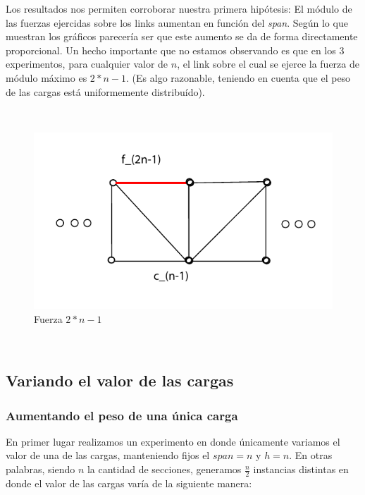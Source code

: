 Los resultados nos permiten corroborar nuestra primera hipótesis: El módulo de las fuerzas ejercidas sobre los links aumentan en función
del \emph{span}. Según lo que muestran los gráficos parecería ser que este aumento se da de forma directamente proporcional. Un hecho
importante que no estamos observando es que en los 3 experimentos, para cualquier valor de $n$, el link sobre el cual se ejerce 
la fuerza de módulo máximo es $2*n-1$. (Es algo razonable, teniendo en cuenta que el peso de las cargas está uniformemente 
distribuído).

~

\begin{figure}[!h]
	\begin{center}
		  \includegraphics[scale=0.75]{Imagenes/im_12.pdf}
		  \caption{Fuerza $2*n-1$}
		  \label{fig:contra1}
	\end{center}
\end{figure}
\FloatBarrier

~

\subsection{Variando el valor de las cargas}

\subsubsection{Aumentando el peso de una única carga}

En primer lugar realizamos un experimento en donde únicamente variamos el valor de una de las cargas, manteniendo fijos el $span=n$
y $h=n$. En otras palabras, siendo $n$ la cantidad de secciones, generamos $\frac{n}{2}$ instancias distintas en donde el valor
de las cargas varía de la siguiente manera:

